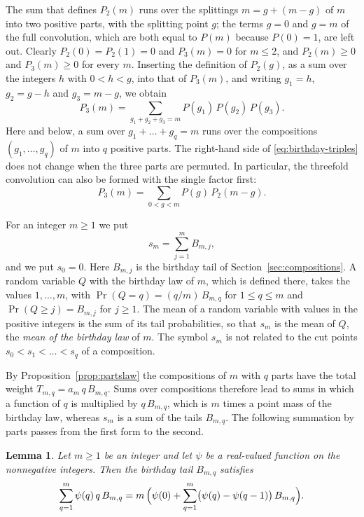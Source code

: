 \documentclass{amsart}
\makeatletter
\newtheorem{lemma}[theorem]{Lemma}
\theoremstyle{definition}
\theoremstyle{remark}
\numberwithin{equation}{section}
\def\subsection{\@startsection{subsection}{2}\z@{.5\linespacing\@plus.7\linespacing}{-.5em}{\normalfont\bfseries\boldmath}}
\makeatother
\begin{document}
The sum
that defines $P_2(m)$ runs over the splittings $m=g+(m-g)$ of $m$ into two
positive parts, with the splitting point $g$; the terms $g=0$ and
$g=m$ of the full convolution, which are both equal to $P(m)$ because
$P(0)=1$, are left out. Clearly $P_2(0)=P_2(1)=0$ and $P_3(m)=0$ for
$m\le2$, and $P_2(m)\ge0$ and $P_3(m)\ge0$ for every $m$. Inserting the
definition of $P_2(g)$, as a sum over the integers $h$ with $0<h<g$, into
that of $P_3(m)$, and writing $g_1=h$, $g_2=g-h$ and $g_3=m-g$, we obtain
\begin{equation}\label{eq:birthday-triples}
P_3(m)=\sum_{g_1+g_2+g_3=m}P(g_1)\,P(g_2)\,P(g_3).
\end{equation}
Here and below, a sum over $g_1+\dots+g_q=m$ runs over the compositions
$(g_1,\dots,g_q)$ of $m$ into $q$ positive parts. The right-hand side of
\eqref{eq:birthday-triples} does not change when the three parts are
permuted. In particular, the threefold convolution can also be formed with
the single factor first:
\[
P_3(m)=\sum_{0<g<m}P(g)\,P_2(m-g).
\]

\subsection{Moments of the birthday law}\label{subsec:birthday-moments}

For an integer $m\ge1$ we put
\[
s_m=\sum_{j=1}^{m}B_{m,j},
\]
and we put $s_0=0$. Here $B_{m,j}$ is the birthday tail of
Section~\ref{sec:compositions}. A random variable $Q$ with the birthday law
of $m$, which is defined there, takes the values $1,\dots,m$, with
$\Pr(Q=q)=(q/m)\,B_{m,q}$ for $1\le q\le m$ and $\Pr(Q\ge j)=B_{m,j}$ for
$j\ge1$. The mean of a random variable with values in the
positive integers is the sum of its tail probabilities, so that $s_m$ is
the mean of $Q$, the \emph{mean of the birthday law} of $m$. The symbol
$s_m$ is not related to the cut points $s_0<s_1<\dots<s_q$ of a composition.

By Proposition~\ref{prop:partslaw} the compositions of $m$ with $q$ parts
have the total weight $T_{m,q}=a_m\,q\,B_{m,q}$. Sums over compositions
therefore lead to sums in which a function of $q$ is multiplied by
$q\,B_{m,q}$, which is $m$ times a point mass of the birthday law, whereas
$s_m$ is a sum of the tails $B_{m,q}$. The following summation by parts
passes from the first form to the second.

\begin{lemma}\label{lem:abelsummation}
Let $m\ge1$ be an integer and let $\psi$ be a real-valued function on the
nonnegative integers. Then the birthday tail $B_{m,q}$ satisfies
\[
\sum_{q=1}^{m}\psi(q)\,q\,B_{m,q}
=m\,\Bigl(\psi(0)+\sum_{q=1}^{m}\bigl(\psi(q)-\psi(q-1)\bigr)\,B_{m,q}\Bigr).
\]
\end{lemma}
\end{document}
